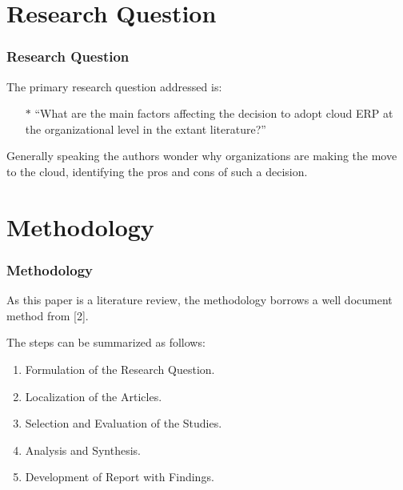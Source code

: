 \documentclass{beamer}
\begin{document}
\section{Research Question}

\begin{frame}

    \frametitle{Research Question}

    The primary research question addressed is:
    \begin{itemize}
        \item[$\ast$] ``What are the main factors affecting the decision to adopt cloud ERP at the organizational level in the extant literature?'' \pause
    \end{itemize}

    \vspace{5mm}
    Generally speaking the authors wonder why organizations are making the move to the cloud, identifying the pros and cons of such a decision. 

\end{frame}


\section{Methodology}

\begin{frame}

    \frametitle{Methodology}

    As this paper is a literature review, the methodology borrows a well document method from [2]. \pause

    \vspace{5mm}
    The steps can be summarized as follows:
    \begin{enumerate}
        \item Formulation of the Research Question. \pause
        \item Localization of the Articles. \pause
        \item Selection and Evaluation of the Studies. \pause
        \item Analysis and Synthesis. \pause
        \item Development of Report with Findings. 
    \end{enumerate}

\end{frame}
\end{document}
